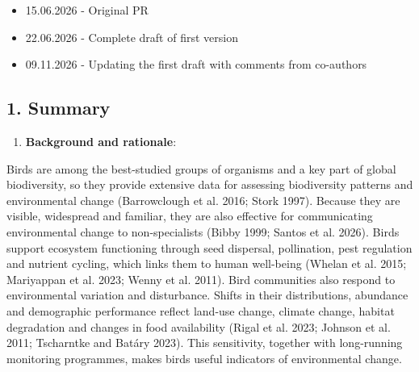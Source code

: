 \documentclass[
  letterpaper,
  DIV=11,
  numbers=noendperiod]{scrartcl}
\providecommand{\tightlist}{%
  \setlength{\itemsep}{0pt}\setlength{\parskip}{0pt}}
\begin{document}
\begin{tcolorbox}[enhanced jigsaw, arc=.35mm, bottomrule=.15mm, bottomtitle=1mm, breakable, colback=white, colbacktitle=quarto-callout-tip-color!10!white, colframe=quarto-callout-tip-color-frame, coltitle=black, left=2mm, leftrule=.75mm, opacityback=0, opacitybacktitle=0.6, rightrule=.15mm, title={Log}, titlerule=0mm, toprule=.15mm, toptitle=1mm]

\begin{itemize}
\item
  15.06.2026 - Original PR
\item
  22.06.2026 - Complete draft of first version
\item
  09.11.2026 - Updating the first draft with comments from co-authors
\end{itemize}

\end{tcolorbox}

\subsection{1. Summary}\label{summary}

\begin{enumerate}
\def\labelenumi{\arabic{enumi}.}
\tightlist
\item
  \textbf{Background and rationale}:
\end{enumerate}

Birds are among the best-studied groups of organisms and a key part of
global biodiversity, so they provide extensive data for assessing
biodiversity patterns and environmental change (Barrowclough et al.
2016; Stork 1997). Because they are visible, widespread and familiar,
they are also effective for communicating environmental change to
non-specialists (Bibby 1999; Santos et al. 2026). Birds support
ecosystem functioning through seed dispersal, pollination, pest
regulation and nutrient cycling, which links them to human well-being
(Whelan et al. 2015; Mariyappan et al. 2023; Wenny et al. 2011). Bird
communities also respond to environmental variation and disturbance.
Shifts in their distributions, abundance and demographic performance
reflect land-use change, climate change, habitat degradation and changes
in food availability ({Rigal et al.} 2023; Johnson et al. 2011;
Tscharntke and Batáry 2023). This sensitivity, together with
long-running monitoring programmes, makes birds useful indicators of
environmental change.
\end{document}
